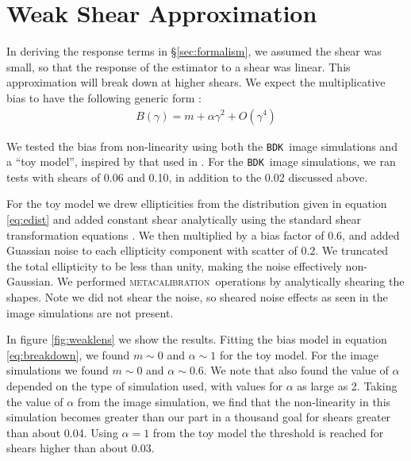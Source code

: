 \documentclass[iop]{emulateapj}
\newcommand{\mcal}{\textsc{metacalibration}}
\newcommand{\bdksim}{\texttt{BDK}}
\begin{document}
\section{Weak Shear Approximation} \label{sec:weakshear}

In deriving the response terms in \S \ref{sec:formalism}, we assumed the shear
was small, so that the response of the estimator to a shear was linear. This
approximation will break down at higher shears.  We expect
the multiplicative bias to have the following generic form \citep{bfd2016}:
\begin{align} \label{eq:breakdown}
	B(\gamma) = m + \alpha \gamma^2 + O(\gamma^4)
\end{align}

We tested the bias from non-linearity using both the \bdksim\ image
simulations and a ``toy model'', inspired by that used in \citep{ba14}.
For the \bdksim\ image simulations, we ran tests with shears of
0.06 and 0.10, in addition to the 0.02 discussed above.

For the toy model we drew ellipticities from the distribution given in equation
\ref{eq:edist} and added constant shear analytically using the standard shear
transformation equations \citep{SeitzSchneider97}.  We then multiplied by a
bias factor of 0.6, and added Guassian noise to each ellipticity component with
scatter of 0.2. We truncated the total ellipticity to be less than unity,
making the noise effectively non-Gaussian.  We performed \mcal\ operations by
analytically shearing the shapes.  Note we did not shear the noise, so sheared
noise effects as seen in the image simulations are not present.

In figure \ref{fig:weaklens} we show the results.  Fitting the bias model in
equation \ref{eq:breakdown}, we found $m \sim 0$ and $\alpha \sim 1$ for the
toy model.  For the image simulations we found $m \sim 0$ and $\alpha \sim
0.6$. We note that \cite{bfd2016} also found the value of $\alpha$
depended on the type of simulation used, with values for $\alpha$
as large as 2.
Taking the value of $\alpha$ from the image simulation, we find that the
non-linearity in this simulation becomes greater than our part in a thousand
goal for shears greater than about 0.04.  Using $\alpha=1$ from the toy
model the threshold is reached for shears higher than about 0.03.
\end{document}
